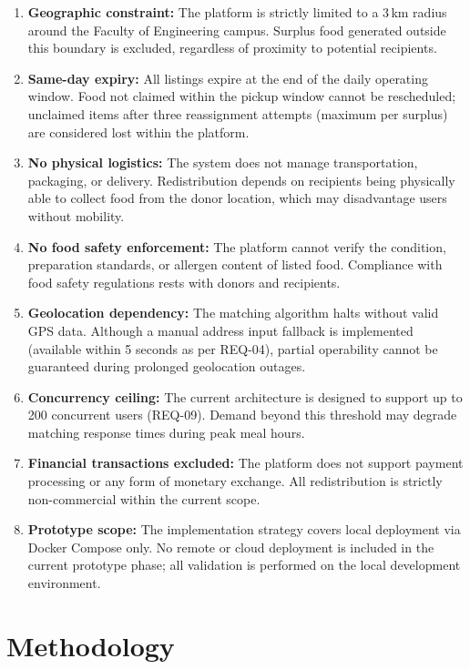 \documentclass[conference]{IEEEtran}
\begin{document}
\begin{enumerate}
    \item \textbf{Geographic constraint:} The platform is strictly limited to a 3\,km radius around the Faculty of Engineering campus. Surplus food generated outside this boundary is excluded, regardless of proximity to potential recipients.
    \item \textbf{Same-day expiry:} All listings expire at the end of the daily operating window. Food not claimed within the pickup window cannot be rescheduled; unclaimed items after three reassignment attempts (maximum per surplus) are considered lost within the platform.
    \item \textbf{No physical logistics:} The system does not manage transportation, packaging, or delivery. Redistribution depends on recipients being physically able to collect food from the donor location, which may disadvantage users without mobility.
    \item \textbf{No food safety enforcement:} The platform cannot verify the condition, preparation standards, or allergen content of listed food. Compliance with food safety regulations rests with donors and recipients.
    \item \textbf{Geolocation dependency:} The matching algorithm halts without valid GPS data. Although a manual address input fallback is implemented (available within 5 seconds as per REQ-04), partial operability cannot be guaranteed during prolonged geolocation outages.
    \item \textbf{Concurrency ceiling:} The current architecture is designed to support up to 200 concurrent users (REQ-09). Demand beyond this threshold may degrade matching response times during peak meal hours.
    \item \textbf{Financial transactions excluded:} The platform does not support payment processing or any form of monetary exchange. All redistribution is strictly non-commercial within the current scope.
    \item \textbf{Prototype scope:} The implementation strategy covers local deployment via Docker Compose only. No remote or cloud deployment is included in the current prototype phase; all validation is performed on the local development environment.
\end{enumerate}

\section{Methodology}
\end{document}
